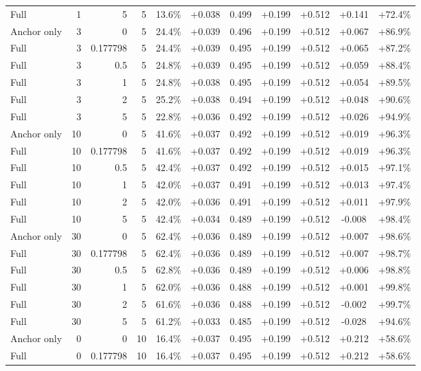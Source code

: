 \begin{table}[htbp]
\begin{tabular}{lrrrccccccc}
Full & 1 & 5 & 5 & 13.6\% & +0.038 & 0.499 & +0.199 & +0.512 & +0.141 & +72.4\% \\
Anchor only & 3 & 0 & 5 & 24.4\% & +0.039 & 0.496 & +0.199 & +0.512 & +0.067 & +86.9\% \\
Full & 3 & 0.177798 & 5 & 24.4\% & +0.039 & 0.495 & +0.199 & +0.512 & +0.065 & +87.2\% \\
Full & 3 & 0.5 & 5 & 24.8\% & +0.039 & 0.495 & +0.199 & +0.512 & +0.059 & +88.4\% \\
Full & 3 & 1 & 5 & 24.8\% & +0.038 & 0.495 & +0.199 & +0.512 & +0.054 & +89.5\% \\
Full & 3 & 2 & 5 & 25.2\% & +0.038 & 0.494 & +0.199 & +0.512 & +0.048 & +90.6\% \\
Full & 3 & 5 & 5 & 22.8\% & +0.036 & 0.492 & +0.199 & +0.512 & +0.026 & +94.9\% \\
Anchor only & 10 & 0 & 5 & 41.6\% & +0.037 & 0.492 & +0.199 & +0.512 & +0.019 & +96.3\% \\
Full & 10 & 0.177798 & 5 & 41.6\% & +0.037 & 0.492 & +0.199 & +0.512 & +0.019 & +96.3\% \\
Full & 10 & 0.5 & 5 & 42.4\% & +0.037 & 0.492 & +0.199 & +0.512 & +0.015 & +97.1\% \\
Full & 10 & 1 & 5 & 42.0\% & +0.037 & 0.491 & +0.199 & +0.512 & +0.013 & +97.4\% \\
Full & 10 & 2 & 5 & 42.0\% & +0.036 & 0.491 & +0.199 & +0.512 & +0.011 & +97.9\% \\
Full & 10 & 5 & 5 & 42.4\% & +0.034 & 0.489 & +0.199 & +0.512 & -0.008 & +98.4\% \\
Anchor only & 30 & 0 & 5 & 62.4\% & +0.036 & 0.489 & +0.199 & +0.512 & +0.007 & +98.6\% \\
Full & 30 & 0.177798 & 5 & 62.4\% & +0.036 & 0.489 & +0.199 & +0.512 & +0.007 & +98.7\% \\
Full & 30 & 0.5 & 5 & 62.8\% & +0.036 & 0.489 & +0.199 & +0.512 & +0.006 & +98.8\% \\
Full & 30 & 1 & 5 & 62.0\% & +0.036 & 0.488 & +0.199 & +0.512 & +0.001 & +99.8\% \\
Full & 30 & 2 & 5 & 61.6\% & +0.036 & 0.488 & +0.199 & +0.512 & -0.002 & +99.7\% \\
Full & 30 & 5 & 5 & 61.2\% & +0.033 & 0.485 & +0.199 & +0.512 & -0.028 & +94.6\% \\
Anchor only & 0 & 0 & 10 & 16.4\% & +0.037 & 0.495 & +0.199 & +0.512 & +0.212 & +58.6\% \\
Full & 0 & 0.177798 & 10 & 16.4\% & +0.037 & 0.495 & +0.199 & +0.512 & +0.212 & +58.6\% \\

\end{tabular}
\end{table}
